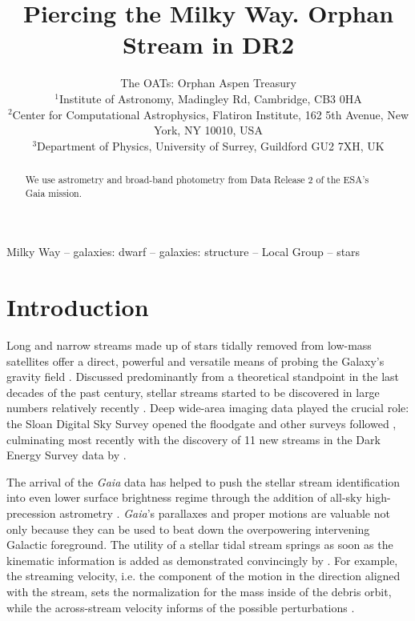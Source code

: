 \documentclass[a4paper,useAMS,usenatbib]{mnras}
\title[Orphan Stream in \gaia DR2]{Piercing the Milky Way. Orphan
  Stream in \gaia DR2}
\author[The OATs]{The OATs: Orphan Aspen Treasury\\
  $^{1}$Institute of Astronomy, Madingley Rd, Cambridge, CB3 0HA\\
  $^{2}$Center for Computational Astrophysics, Flatiron Institute, 162 5th Avenue, New York, NY 10010, USA\\
  $^{3}$Department of Physics, University of Surrey, Guildford GU2 7XH, UK\\
}
\newcommand{\Gaia}{{\it Gaia}}
\newcommand{\gaia}{\textit{Gaia} }
\begin{document}
\maketitle

\label{firstpage}

\begin{abstract}
We use astrometry and broad-band photometry from Data Release 2 of the
ESA's Gaia mission.

\end{abstract}

\begin{keywords}
Milky Way -- galaxies: dwarf -- galaxies: structure -- Local Group -- stars
\end{keywords}

\section{Introduction}

Long and narrow streams made up of stars tidally removed from low-mass
satellites offer a direct, powerful and versatile means of probing the
Galaxy's gravity field \citep[see e.g.][]{Donald1982, Kuhn1993,
  Donald1995,Johnston1996,Helmi1999,Johnston1999,Murali1999}. Discussed
predominantly from a theoretical standpoint in the last decades of the
past century, stellar streams started to be discovered in large
numbers relatively recently
\citep[e.g.][]{Ibata2001,Odenkirchen2001,Newberg2002,
  Majewski2003,FOS,Grillmair2006}. Deep wide-area imaging data played
the crucial role: the Sloan Digital Sky Survey \citep[SDSS,
  see][]{Gunn1998,York2000,SDSS_DR8,SDSS_DR12} opened the floodgate
\citep[e.g.][]{OS_C,OS_V,Grillmair2009,Newberg2009,Koposov2012,
  Bonaca2012} and other surveys followed
\citep[e.g.][]{Koposov2014,Bernard2016,Balbinot2016}, culminating most
recently with the discovery of 11 new streams in the Dark Energy
Survey data \citep[DES, see][]{DES2005,DES2016} by \citet{Shipp2018}.

The arrival of the \gaia data \citep[see][]{Prusti2016, Brown2018} has
helped to push the stellar stream identification into even lower
surface brightness regime through the addition of all-sky
high-precession astrometry
\citep[see][]{Myeong2018,Ibata2018,Koppelman2018,Malhan2018,Adrian2018,CloudsArms}.
\Gaia's parallaxes and proper motions are valuable not only because
they can be used to beat down the overpowering intervening Galactic
foreground. The utility of a stellar tidal stream springs as soon as
the kinematic information is added as demonstrated convincingly by
\citet{Koposov2010}. For example, the streaming velocity, i.e. the
component of the motion in the direction aligned with the stream, sets
the normalization for the mass inside of the debris orbit, while the
across-stream velocity informs of the possible perturbations
\citep[see e.g.][]{Erkal2018}.
\end{document}
